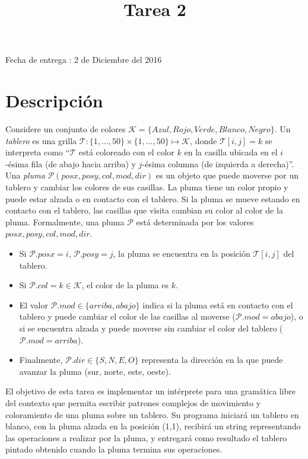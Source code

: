 \documentclass[dcc]{fcfmcourse}
\title{Tarea 2}
\begin{document}
\maketitle
\begin{center}
Fecha de entrega : 2 de Diciembre del 2016
\end{center}
\vspace{-1ex}

\section*{Descripción}
Considere un conjunto de colores \textbf{$\mathcal{K} = \{Azul, Rojo, Verde, Blanco, Negro\}$}. Un \textit{tablero} es una grilla $\mathcal{T}:\{1,\ldots,50\} \times \{1,\ldots,50\} \mapsto \mathcal{K}$, donde $\mathcal{T}[i,j]=k$ se interpreta como ``$\mathcal{T}$ está coloreado con el color $k$ en la casilla ubicada en el $i$-ésima fila (de abajo hacia arriba) y $j$-ésima columna (de izquierda a derecha)''.\\

Una \textit{pluma} $\mathcal{P}(posx,posy,col,mod,dir)$ es un objeto que puede moverse por un tablero y cambiar los colores de sus casillas. La pluma tiene un color propio y puede estar alzada o en contacto con el tablero. Si la pluma se mueve estando en contacto con el tablero, las casillas que visita cambian su color al color de la pluma. Formalmente, una pluma $\mathcal{P}$ está determinada por los valores $posx,posy,col,mod,dir$.
\begin{itemize}
\item Si $\mathcal{P}.posx = i$, $\mathcal{P}.posy=j$, la pluma se encuentra en la posición $\mathcal{T}[i,j]$ del tablero.
\item Si $\mathcal{P}.col = k \in \mathcal{K}$, el color de la pluma es $k$.
\item El valor $\mathcal{P}.mod \in \{arriba, abajo\}$ indica si la pluma está en contacto con el tablero y puede cambiar el color de las casillas al moverse ($\mathcal{P}.mod=abajo$), o si se encuentra alzada y puede moverse sin cambiar el color del tablero ($\mathcal{P}.mod=arriba$).
\item Finalmente, $\mathcal{P}.dir \in \{S,N,E,O\}$ representa la dirección en la que puede avanzar la pluma (sur, norte, este, oeste).
\end{itemize}

El objetivo de esta tarea es implementar un intérprete para una gramática libre  del contexto que permita escribir patrones complejos de movimiento y coloramiento de una pluma sobre un tablero. Su programa iniciará un tablero en blanco, con la pluma alzada en la posición (1,1), recibirá un string representando las operaciones a realizar por la pluma, y entregará como resultado el tablero pintado obtenido cuando la pluma termina sus operaciones.
\newpage
\end{document}
